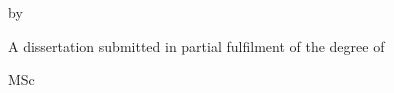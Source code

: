 \begin{titlepage}
	
\begin{centering}
\begin{Large}
	
	\thesisUniversity
	
	\vspace{0.5em}
	
	\thesisFaculty
	
	\thesisSchool
	
	\vspace{3em}
	
	\thesisTitle
	
	\vspace{1em}
	
	by
	
	\vspace{1em}
	
	\thesisAuthor
	
	\thesisDate
	
	\vfill
	
	A dissertation submitted in partial fulfilment of the degree of
	
	MSc \MScPathway
	
	\vfill
	
\end{Large}
\end{centering}

\end{titlepage}
